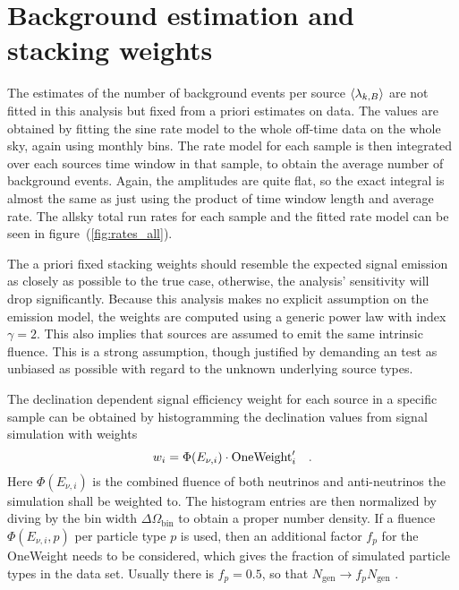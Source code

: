 \section{Background estimation and stacking weights}
The estimates of the number of background events per source $\Braket{\lambda_{k,B}}$ are not fitted in this analysis but fixed from a priori estimates on data.
The values are obtained by fitting the sine rate model to the whole off-time data on the whole sky, again using monthly bins.
The rate model for each sample is then integrated over each sources time window in that sample, to obtain the average number of background events.
Again, the amplitudes are quite flat, so the exact integral is almost the same as just using the product of time window length and average rate.
The allsky total run rates for each sample and the fitted rate model can be seen in figure~(\ref{fig:rates_all}).

The a priori fixed stacking weights should resemble the expected signal emission as closely as possible to the true case, otherwise, the analysis' sensitivity will drop significantly.
Because this analysis makes no explicit assumption on the emission model, the weights are computed using a generic power law with index $\gamma = 2$.
This also implies that sources are assumed to emit the same intrinsic fluence.
This is a strong assumption, though justified by demanding an test as unbiased as possible with regard to the unknown underlying source types.

The declination dependent signal efficiency weight for each source in a specific sample can be obtained by histogramming the declination values from signal simulation with weights
\begin{equation}
  w_i = \Phi(E_{\nu,i})\cdot\text{OneWeight}'_i
  \quad\text{.}
\end{equation}
Here $\Phi(E_{\nu,i})$ is the combined fluence of both neutrinos and anti-neutrinos the simulation shall be weighted to.
The histogram entries are then normalized by diving by the bin width $\Delta\Omega_\text{bin}$ to obtain a proper number density.
If a fluence $\Phi(E_{\nu,i}, p)$ per particle type $p$ is used, then an additional factor $f_p$ for the OneWeight needs to be considered, which gives the fraction of simulated particle types in the data set.
Usually there is $f_p=0.5$, so that $N_\text{gen}\rightarrow f_p N_\text{gen}$ \cite{Gazizov:2004va}.

